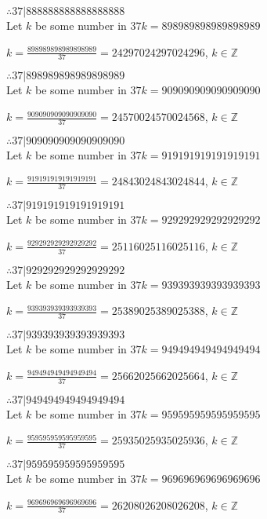 \documentclass{article}
\begin{document}
$ \therefore  37|888888888888888888 $ \\

Let $k$ be some number in $37k = 898989898989898989$

$k = \frac{898989898989898989}{37} = 24297024297024296$, $k \in \mathbb{Z}$

$ \therefore  37|898989898989898989 $ \\

Let $k$ be some number in $37k = 909090909090909090$

$k = \frac{909090909090909090}{37} = 24570024570024568$, $k \in \mathbb{Z}$

$ \therefore  37|909090909090909090 $ \\

Let $k$ be some number in $37k = 919191919191919191$

$k = \frac{919191919191919191}{37} = 24843024843024844$, $k \in \mathbb{Z}$

$ \therefore  37|919191919191919191 $ \\

Let $k$ be some number in $37k = 929292929292929292$

$k = \frac{929292929292929292}{37} = 25116025116025116$, $k \in \mathbb{Z}$

$ \therefore  37|929292929292929292 $ \\

Let $k$ be some number in $37k = 939393939393939393$

$k = \frac{939393939393939393}{37} = 25389025389025388$, $k \in \mathbb{Z}$

$ \therefore  37|939393939393939393 $ \\

Let $k$ be some number in $37k = 949494949494949494$

$k = \frac{949494949494949494}{37} = 25662025662025664$, $k \in \mathbb{Z}$

$ \therefore  37|949494949494949494 $ \\

Let $k$ be some number in $37k = 959595959595959595$

$k = \frac{959595959595959595}{37} = 25935025935025936$, $k \in \mathbb{Z}$

$ \therefore  37|959595959595959595 $ \\

Let $k$ be some number in $37k = 969696969696969696$

$k = \frac{969696969696969696}{37} = 26208026208026208$, $k \in \mathbb{Z}$
\end{document}
